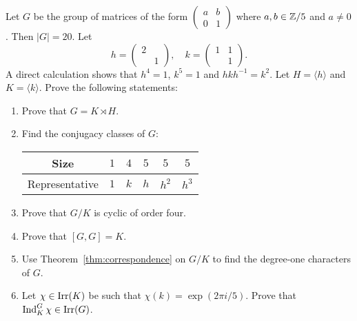 \begin{exercise}
\label{xca:Frobenius_size20}
Let $G$ be the group of matrices 
of the form $\begin{pmatrix}a&b\\0&1\end{pmatrix}$ where $a,b\in\mathbb{Z}/5$ and $a\ne 0$. Then $|G|=20$. Let 
\[
    h=\begin{pmatrix}
        2\\
        &1
    \end{pmatrix},\quad 
    k=\begin{pmatrix}
        1&1\\
        &1
    \end{pmatrix}.
\]
A direct calculation shows that 
$h^4=1$, $k^5=1$ and $hkh^{-1}=k^2$. Let $H=\langle h\rangle$ 
and $K=\langle k\rangle$. Prove the following statements: 

\begin{enumerate}
    \item Prove that $G=K\rtimes H$.
    \item Find the conjugacy classes of $G$: 
\begin{center}
        \begin{tabular}{cccccc}
             Size & $1$ & $4$ & $5$ & $5$ & $5$\\
             \hline 
             Representative & $1$ & $k$ & $h$ & $h^2$ & $h^3$\\
        \end{tabular}
\end{center}
\item Prove that $G/K$ is cyclic of order four. 
\item Prove that $[G,G]=K$. 
\item Use Theorem~\ref{thm:correspondence} on $G/K$ 
    to find the degree-one characters of $G$. 
\item Let $\chi\in\operatorname{Irr}(K)$ be such that $\chi(k)=\exp(2\pi i/5)$. Prove that 
$\operatorname{Ind}_K^G\chi\in\operatorname{Irr}(G)$. 
\end{enumerate}
\end{exercise}



